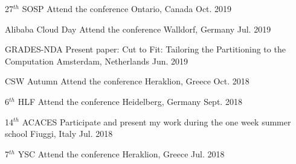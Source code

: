 
\begin{cvhonors}

  \cvhonor
    {27$^{th}$ SOSP} %
    {Attend the conference} %
    {Ontario, Canada} %
    {Oct. 2019} %

  \cvhonor
    {Alibaba Cloud Day} %
    {Attend the conference} %
    {Walldorf, Germany} %
    {Jul. 2019} %

  \cvhonor
    {GRADES-NDA} %
    {Present paper: Cut to Fit: Tailoring the Partitioning to the
    Computation} %
    {Amsterdam, Netherlands} %
    {Jun. 2019} %

  \cvhonor
    {CSW Autumn} %
    {Attend the conference} %
    {Heraklion, Greece} %
    {Oct. 2018} %

  \cvhonor
    {6$^{th}$ HLF} %
    {Attend the conference} %
    {Heidelberg, Germany} %
    {Sept. 2018} %

  \cvhonor
    {14$^{th}$ ACACES} %
    {Participate and present my work during the one week summer school} %
    {Fiuggi, Italy} %
    {Jul. 2018} %

  \cvhonor
    {7$^{th}$ YSC} %
    {Attend the conference} %
    {Heraklion, Greece} %
    {Jul. 2018} %


\end{cvhonors}
